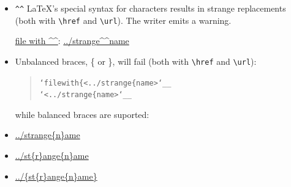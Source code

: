 \documentclass[a4paper]{article}
\newenvironment{DUlineblock}[1]{%
    \list{}{\setlength{\partopsep}{\parskip}
            \addtolength{\partopsep}{\baselineskip}
            \setlength{\topsep}{0pt}
            \setlength{\itemsep}{0.15\baselineskip}
            \setlength{\parsep}{0pt}
            \setlength{\leftmargin}{#1}}
    \raggedright
  }
  {\endlist}
\begin{document}
\begin{itemize}
\item \texttt{\textasciicircum{}\textasciicircum{}} LaTeX's special syntax for characters results in \textquotedbl{}strange\textquotedbl{} replacements
(both with \texttt{\textbackslash{}href} and \texttt{\textbackslash{}url}). The writer emits a warning.

\href{../strange^^name}{file with \textasciicircum{}\textasciicircum{}}:
\url{../strange^^name}

\item Unbalanced braces, \{ or \}, will fail (both with \texttt{\textbackslash{}href} and \texttt{\textbackslash{}url}):

\begin{quote}
\begin{alltt}
`file with \{ <../strange\{name>`__
`<../strange\{name>`__
\end{alltt}
\end{quote}

while balanced braces are suported:

\begin{DUlineblock}{0em}
\item[] \url{../strange{n}ame}
\item[] \url{../st{r}ange{n}ame}
\item[] \url{../{st{r}ange{n}ame}}
\end{DUlineblock}
\end{itemize}
\end{document}
